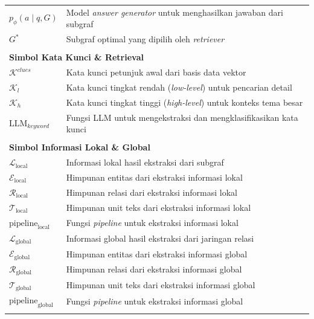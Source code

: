 \documentclass{SkripsiUnesa}
\begin{document}
\begin{longtable}{p{} p{}}
    $p_\phi(a \mid q, G)$ & Model \textit{answer generator} untuk menghasilkan jawaban dari subgraf \\
    $G^*$ & Subgraf optimal yang dipilih oleh \textit{retriever} \\
    \\[0.5em]
    \multicolumn{2}{l}{\textbf{Simbol Kata Kunci \& Retrieval}} \\[0.5em]
    $\mathcal{K}^{clues}$ & Kata kunci petunjuk awal dari basis data vektor \\
    $\mathcal{K}_l$ & Kata kunci tingkat rendah (\textit{low-level}) untuk pencarian detail \\
    $\mathcal{K}_h$ & Kata kunci tingkat tinggi (\textit{high-level}) untuk konteks tema besar \\
    $\text{LLM}_{keyword}$ & Fungsi LLM untuk mengekstraksi dan mengklasifikasikan kata kunci \\
    \\[0.5em]
    \multicolumn{2}{l}{\textbf{Simbol Informasi Lokal \& Global}} \\[0.5em]
    $\mathcal{L}_{\text{local}}$ & Informasi lokal hasil ekstraksi dari subgraf \\
    $\mathcal{E}_{\text{local}}$ & Himpunan entitas dari ekstraksi informasi lokal \\
    $\mathcal{R}_{\text{local}}$ & Himpunan relasi dari ekstraksi informasi lokal \\
    $\mathcal{T}_{\text{local}}$ & Himpunan unit teks dari ekstraksi informasi lokal \\
    $\text{pipeline}_{\text{local}}$ & Fungsi \textit{pipeline} untuk ekstraksi informasi lokal \\
    $\mathcal{L}_{\text{global}}$ & Informasi global hasil ekstraksi dari jaringan relasi \\
    $\mathcal{E}_{\text{global}}$ & Himpunan entitas dari ekstraksi informasi global \\
    $\mathcal{R}_{\text{global}}$ & Himpunan relasi dari ekstraksi informasi global \\
    $\mathcal{T}_{\text{global}}$ & Himpunan unit teks dari ekstraksi informasi global \\
    $\text{pipeline}_{\text{global}}$ & Fungsi \textit{pipeline} untuk ekstraksi informasi global \\
    \\[0.5em]

\end{longtable}
\end{document}
